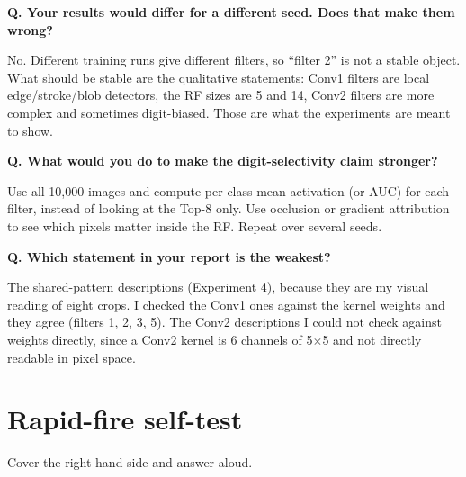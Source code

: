 \documentclass[11pt]{article}
\newcommand{\Q}[1]{\par\vspace{4pt}\noindent\textcolor{qcol}{\textbf{Q. #1}}\par\nopagebreak}
\newcommand{\A}[1]{\noindent #1\par}
\begin{document}
\Q{Your results would differ for a different seed. Does that make them wrong?}
\A{No. Different training runs give different filters, so ``filter 2'' is not a stable object. What should be stable are the qualitative statements: Conv1 filters are local edge/stroke/blob detectors, the RF sizes are 5 and 14, Conv2 filters are more complex and sometimes digit-biased. Those are what the experiments are meant to show.}

\Q{What would you do to make the digit-selectivity claim stronger?}
\A{Use all 10,000 images and compute per-class mean activation (or AUC) for each filter, instead of looking at the Top-8 only. Use occlusion or gradient attribution to see which pixels matter inside the RF. Repeat over several seeds.}

\Q{Which statement in your report is the weakest?}
\A{The shared-pattern descriptions (Experiment 4), because they are my visual reading of eight crops. I checked the Conv1 ones against the kernel weights and they agree (filters 1, 2, 3, 5). The Conv2 descriptions I could not check against weights directly, since a Conv2 kernel is 6 channels of 5$\times$5 and not directly readable in pixel space.}

\section{Rapid-fire self-test}

Cover the right-hand side and answer aloud.
\end{document}
